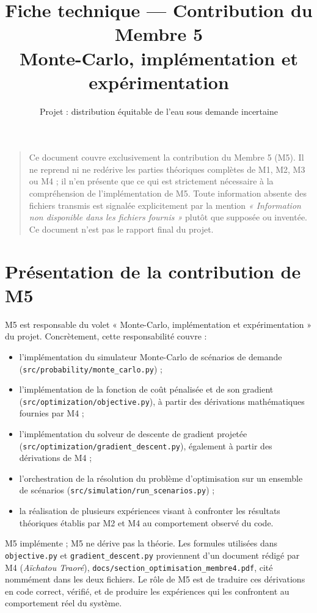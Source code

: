 \documentclass[11pt,a4paper]{article}
\title{Fiche technique --- Contribution du Membre 5\\
\large Monte-Carlo, implémentation et expérimentation}
\author{Projet : distribution équitable de l'eau sous demande incertaine}
\date{}
\begin{document}
\maketitle

\begin{quote}
\small
Ce document couvre exclusivement la contribution du Membre 5 (M5). Il ne
reprend ni ne redérive les parties théoriques complètes de M1, M2, M3 ou M4 ;
il n'en présente que ce qui est strictement nécessaire à la compréhension de
l'implémentation de M5. Toute information absente des fichiers transmis est
signalée explicitement par la mention \emph{« Information non disponible dans
les fichiers fournis »} plutôt que supposée ou inventée. Ce document n'est pas
le rapport final du projet.
\end{quote}

\tableofcontents

\section{Présentation de la contribution de M5}

M5 est responsable du volet « Monte-Carlo, implémentation et
expérimentation » du projet. Concrètement, cette responsabilité couvre :

\begin{itemize}
  \item l'implémentation du simulateur Monte-Carlo de scénarios de demande
  (\texttt{src/probability/monte\_carlo.py}) ;
  \item l'implémentation de la fonction de coût pénalisée et de son gradient
  (\texttt{src/optimization/objective.py}), à partir des dérivations
  mathématiques fournies par M4 ;
  \item l'implémentation du solveur de descente de gradient projetée
  (\texttt{src/optimization/gradient\_descent.py}), également à partir des
  dérivations de M4 ;
  \item l'orchestration de la résolution du problème d'optimisation sur un
  ensemble de scénarios (\texttt{src/simulation/run\_scenarios.py}) ;
  \item la réalisation de plusieurs expériences visant à confronter les
  résultats théoriques établis par M2 et M4 au comportement observé du code.
\end{itemize}

M5 implémente ; M5 ne dérive pas la théorie. Les formules utilisées dans
\texttt{objective.py} et \texttt{gradient\_descent.py} proviennent d'un
document rédigé par M4 (\emph{Aïchatou Traoré}),
\texttt{docs/section\_optimisation\_membre4.pdf}, cité nommément dans les deux
fichiers. Le rôle de M5 est de traduire ces dérivations en code correct,
vérifié, et de produire les expériences qui les confrontent au comportement
réel du système.
\end{document}
